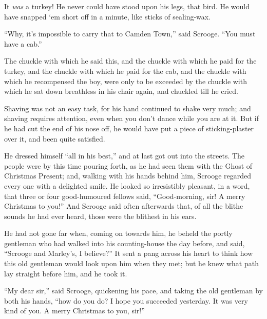 \documentclass[paper=5.5in:8.5in,BCOR=10mm,twoside,DIV=15,12pt,usegeometry,openany]{scrbook} %
\begin{document}
It \textit{was} a turkey! He never could have stood upon his legs, that bird. He would have snapped `em short off in a minute, like sticks of sealing-wax.

\enquote{Why, it's impossible to carry that to Camden Town,} said Scrooge. \enquote{You must have a cab.}

The chuckle with which he said this, and the chuckle with which he paid for the turkey, and the chuckle with which he paid for the cab, and the chuckle with which he recompensed the boy, were only to be exceeded by the chuckle with which he sat down breathless in his chair again, and chuckled till he cried.

Shaving was not an easy task, for his hand continued to shake very much; and shaving requires attention, even when you don't dance while you are at it. But if he had cut the end of his nose off, he would have put a piece of sticking-plaster over it, and been quite satisfied.

He dressed himself \enquote{all in his best,} and at last got out into the streets. The people were by this time pouring forth, as he had seen them with the Ghost of Christmas Present; and, walking with his hands behind him, Scrooge regarded every one with a delighted smile. He looked so irresistibly pleasant, in a word, that three or four good-humoured fellows said, \enquote{Good-morning, sir! A merry Christmas to you!} And Scrooge said often afterwards that, of all the blithe sounds he had ever heard, those were the blithest in his ears.

He had not gone far when, coming on towards him, he beheld the portly gentleman who had walked into his counting-house the day before, and said, \enquote{Scrooge and Marley's, I believe?} It sent a pang across his heart to think how this old gentleman would look upon him when they met; but he knew what path lay straight before him, and he took it.

\enquote{My dear sir,} said Scrooge, quickening his pace, and taking the old gentleman by both his hands, \enquote{how do you do? I hope you succeeded yesterday. It was very kind of you. A merry Christmas to you, sir!}
\end{document}
